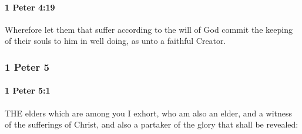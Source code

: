 		\paragraph{1 Peter 4:19} %
			\label{1PETER-4-19}

			Wherefore let them that suffer according to the will of God commit the keeping of their souls to him in well doing, as unto a faithful Creator.

			\begin{framed}
			\scriptsize
				\begin{compactdesc}
					\item[SBLG] 
				\end{compactdesc}
			\end{framed}

	\subsubsection{1 Peter 5} %
		\label{1PETER-5}
		
		\paragraph{1 Peter 5:1} %
			\label{1PETER-5-1}

			THE elders which are among you I exhort, who am also an elder, and a witness of the sufferings of Christ, and also a partaker of the glory that shall be revealed:

